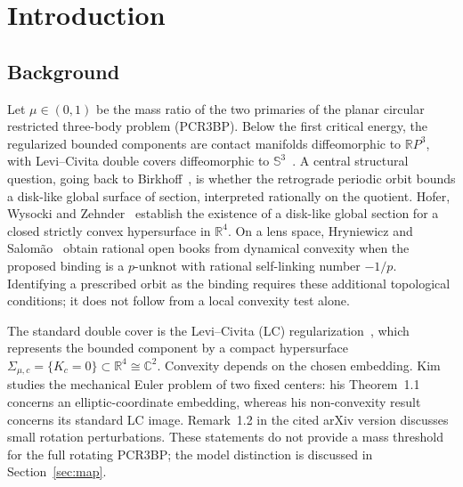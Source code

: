 \documentclass[11pt,reqno]{amsart}
\theoremstyle{plain}
\theoremstyle{definition}
\newcommand{\R}{\mathbb{R}}
\newcommand{\C}{\mathbb{C}}
\newcommand{\Sph}{\mathbb{S}}
\begin{document}
\begin{abstract}
($m_r\approx 0.0122$) loses LC-convexity on an ultrathin shell of width $\approx 9.5\times 10^{-6}$ above the critical energy, where the Lagrange point enters the surface; for the Earth component ($m_r\approx 0.9878$), the scans suggest a macroscopic near-critical non-convexity window and positive sampled gates at offsets $\Delta c\gtrsim 1.2\times 10^{-2}$. This numerically locates a possible limitation of the LC route near the critical limit.
\end{abstract}

\maketitle

\section{Introduction}\label{sec:intro}

\subsection{Background}
Let $\mu\in(0,1)$ be the mass ratio of the two primaries of the planar circular restricted three-body problem (PCR3BP). Below the first critical energy, the regularized bounded components are contact manifolds diffeomorphic to $\mathbb{R}P^3$, with Levi--Civita double covers diffeomorphic to $\Sph^3$~\cite{AFKP}. A central structural question, going back to Birkhoff~\cite{Birkhoff}, is whether the retrograde periodic orbit bounds a disk-like global surface of section, interpreted rationally on the quotient. Hofer, Wysocki and Zehnder~\cite{HWZ} establish the existence of a disk-like global section for a closed strictly convex hypersurface in $\R^4$. On a lens space, Hryniewicz and Salom\~ao~\cite{HS} obtain rational open books from dynamical convexity when the proposed binding is a $p$-unknot with rational self-linking number $-1/p$. Identifying a prescribed orbit as the binding requires these additional topological conditions; it does not follow from a local convexity test alone.

The standard double cover is the Levi--Civita (LC) regularization~\cite{LeviCivita}, which represents the bounded component by a compact hypersurface $\Sigma_{\mu,c}=\{K_c=0\}\subset\R^4\cong\C^2$. Convexity depends on the chosen embedding. Kim~\cite{Kim} studies the mechanical Euler problem of two fixed centers: his Theorem~1.1 concerns an elliptic-coordinate embedding, whereas his non-convexity result concerns its standard LC image. Remark~1.2 in the cited arXiv version discusses small rotation perturbations. These statements do not provide a mass threshold for the full rotating PCR3BP; the model distinction is discussed in Section~\ref{sec:map}.
\end{document}
